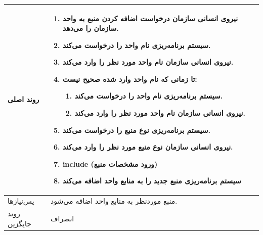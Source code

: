 \begin{table}[H]
\begin{tabular}{|p{3cm}|p{10cm}|}
		
		روند اصلی &
		\begin{enumerate}[topsep=0cm,leftmargin=0.5cm]
			\item نیروی انسانی سازمان درخواست اضافه کردن منبع به واحد سازمان را می‌دهد.
			\item سیستم برنامه‌ریزی نام واحد را درخواست می‌کند.
			\item نیروی انسانی سازمان نام واحد مورد نظر را وارد می‌کند.
			\item تا زمانی که نام واحد وارد شده صحیح نیست:
			\begin{enumerate}[topsep=0cm,leftmargin=0.5cm]
				\item سیستم برنامه‌ریزی نام واحد را درخواست می‌کند.
				\item نیروی انسانی سازمان نام واحد مورد نظر را وارد می‌کند.
			\end{enumerate}
			\item سیستم برنامه‌ریزی نوع منبع را درخواست می‌کند.
			\item نیروی انسانی سازمان نوع منبع مورد نظر را وارد می‌کند.
			\item include (ورود مشخصات منبع)
			\item سیستم برنامه‌ریزی منبع جدید را به منابع واحد اضافه می‌کند
		\end{enumerate} \\
		
		\hline
		
		پس‌نیازها &
		منبع موردنظر به منابع واحد اضافه می‌شود. \\
		
		\hline
		روند جایگزین
		& انصراف \\
		\hline
		
	\end{tabular}
\end{table}


